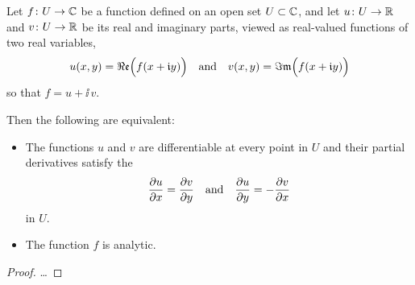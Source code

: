 \begin{theorem}
  \label{thm:cauchy_riemann}
  Let $f \colon U \to \mathbb{C}$ be a function defined on an open set $U \subset \mathbb{C}$,
  and let $u \colon U \to \mathbb{R}$ and $v \colon U \to \mathbb{R}$ be its
  real and imaginary parts, viewed as real-valued functions of two real variables,
  \begin{align*}
    u(x,y) = \Re\mathfrak{e} \Big( f (x + \mathfrak{i} y) \Big)
    \quad \text{and} \quad
    v(x,y) = \Im\mathfrak{m} \Big( f (x + \mathfrak{i} y) \Big)
  \end{align*}
  so that $f = u + \ii \, v$.

  Then the following are equivalent:
  \begin{itemize}
    \item The functions $u$ and $v$ are differentiable at every point in $U$
          and their partial derivatives satisfy the 
          \begin{align*}
            \frac{\partial {u}}{\partial {x}} = \frac{\partial {v}}{\partial {y}}
            \quad \text{and} \quad
            \frac{\partial {u}}{\partial {y}} = - \frac{\partial {v}}{\partial {x}}
          \end{align*}
          in $U$.
    \item The function $f$ is analytic.
  \end{itemize}
%
%
\end{theorem}
\begin{proof}
  \ldots
\end{proof}

